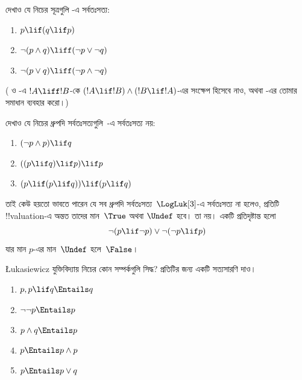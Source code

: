 \documentclass[../../../include/open-logic-section]{subfiles}
\begin{document}
\begin{prob}
  দেখাও যে নিচের সূত্রগুলি \LogLuk[3]-এ সর্বতঃসত্য:
  \begin{enumerate}
    \item $p \lif (q \lif p)$
    \item\label{mvl:thr:luk:prob:luk-taut-2} $\lnot(p \land q) \liff (\lnot p \lor \lnot q)$
    \item\label{mvl:thr:luk:prob:luk-taut-3} $\lnot(p \lor q) \liff (\lnot p \land \lnot q)$
  \end{enumerate}
  ( ও
  -এ $!A \liff !B$-কে
  $(!A \lif !B) \land (!B \lif !A)$-এর সংক্ষেপ হিসেবে নাও, অথবা
  -এর তোমার সমাধান ব্যবহার করো।)
\end{prob}

\begin{prob}
  দেখাও যে নিচের ধ্রুপদি সর্বতঃসত্যগুলি~\LogLuk[3]-এ সর্বতঃসত্য নয়:
  \begin{enumerate}
    \item $(\lnot p \land p) \lif q$
    \item $((p \lif q) \lif p) \lif p$
    \item $(p \lif (p \lif q)) \lif (p \lif q)$
  \end{enumerate}
\end{prob}

তাই কেউ হয়তো ভাবতে পারেন যে সব ধ্রুপদি সর্বতঃসত্য~$\LogLuk[3]$-এ
সর্বতঃসত্য না হলেও, প্রতিটি !!{valuation}-এ অন্তত তাদের মান~$\True$ অথবা
$\Undef$ হবে। তা নয়। একটি প্রতিদৃষ্টান্ত হলো
\[
  \lnot(p \lif \lnot p) \lor \lnot(\lnot p \lif p)
\]
যার মান $p$-এর মান~$\Undef$ হলে~$\False$।

\begin{prob}
  \L ukasiewicz যুক্তিবিদ্যায় নিচের কোন সম্পর্কগুলি সিদ্ধ? প্রতিটির
  জন্য একটি সত্যসারণি দাও।
  \begin{enumerate}
    \item $p, p \lif q \Entails q$
    \item $\lnot\lnot p \Entails p$
    \item $p \land q \Entails p$
    \item $p \Entails p \land p$
    \item $p \Entails p \lor q$
  \end{enumerate}
\end{prob}
\end{document}
